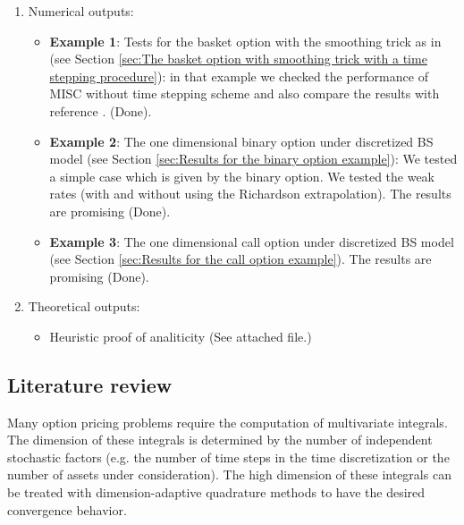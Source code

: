 \documentclass[11pt]{article}
\begin{document}
\begin{enumerate}
	\item Numerical outputs:
	\begin{itemize}
	
	 \item \textbf{Example 1}: Tests for  the basket option with the smoothing trick as in \cite{bayersmoothing} (see Section \ref{sec:The basket option with smoothing trick with a time stepping procedure}): in that example we  checked the performance of MISC without time stepping scheme and also compare the results with reference \cite{bayersmoothing}. (Done).
	
	
	
		\item 	  \textbf{Example 2}: The one dimensional binary option under discretized BS model (see Section \ref{sec:Results for the binary option example}):  We tested a simple case which is given by the binary option. We tested the weak rates (with and without using the Richardson extrapolation). The results are  promising (Done).
		
		\item \textbf{Example 3}: The one dimensional call option under discretized BS model (see Section \ref{sec:Results for the call option example}). The results are  promising (Done).
		\end{itemize}
	\item  Theoretical outputs:
	\begin{itemize}
		\item Heuristic proof of analiticity (See attached file.)
	\end{itemize}
\end{enumerate}

\subsection{Literature review}




Many option pricing problems  require the computation of multivariate integrals. The dimension of these integrals
is determined by the number of independent stochastic factors (e.g. the number of time steps in the time discretization or the number of assets under consideration).  The high dimension of these integrals can be treated with dimension-adaptive quadrature methods to have the desired convergence behavior.
\end{document}

